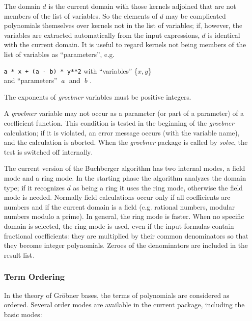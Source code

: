 The domain $d$ is the current \REDUCE domain with those kernels
adjoined that are not members of the list of variables. So the
elements of $d$ may be complicated polynomials themselves over
kernels not in the list of variables; if, however, the variables are
extracted automatically from the input expressions, $d$ is identical
with the current \REDUCE domain. It is useful to regard kernels not
being members of the list of variables as ``parameters'', e.g.
\begin{center}
\texttt{a * x + (a - b) * y**2} with ``variables'' \{$x,y$\} \\
and ``parameters'' $\;a\;$ and $\;b\;$.
\end{center}

The exponents of \emph{groebner} variables must be positive integers.

A \emph{groebner} variable may not occur as a parameter (or part
of a parameter) of a coefficient function. This condition is
tested in the beginning of the \emph{groebner} calculation; if it is
violated, an error message occurs (with the variable name), and the
calculation is aborted. When the \emph{groebner} package is called by
\emph{solve}, the test is switched off internally.

The current version of the Buchberger algorithm has two internal
modes, a field mode and a ring mode. In the starting phase the
algorithm analyzes the domain type; if it recognizes $d$ as being a
ring it uses the ring mode, otherwise the field mode is needed.
Normally field calculations occur only if all coefficients are numbers
and if the current \REDUCE domain is a field (e.g. rational numbers,
modular numbers modulo a prime). In general, the ring mode is faster.
When no specific
\REDUCE domain is selected, the ring mode is used, even if the input
formulas contain fractional coefficients: they are multiplied by their
common denominators so that they become integer polynomials. Zeroes of the
denominators are included in the result list.

\subsubsection{Term Ordering} \par
In the theory of Gr\"obner bases, the terms of polynomials are
considered as ordered. Several order modes are available in
the current package, including the basic modes:

